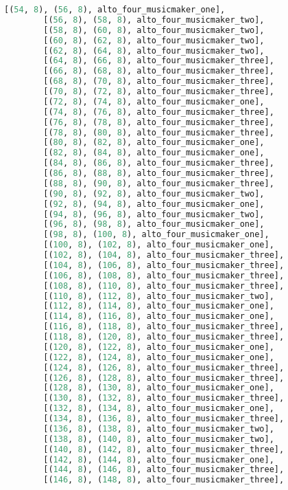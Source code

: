 \begin{lstlisting}[language=Python, caption=Invocation Source Code]
        [(54, 8), (56, 8), alto_four_musicmaker_one],
        [(56, 8), (58, 8), alto_four_musicmaker_two],
        [(58, 8), (60, 8), alto_four_musicmaker_two],
        [(60, 8), (62, 8), alto_four_musicmaker_two],
        [(62, 8), (64, 8), alto_four_musicmaker_two],
        [(64, 8), (66, 8), alto_four_musicmaker_three],
        [(66, 8), (68, 8), alto_four_musicmaker_three],
        [(68, 8), (70, 8), alto_four_musicmaker_three],
        [(70, 8), (72, 8), alto_four_musicmaker_three],
        [(72, 8), (74, 8), alto_four_musicmaker_one],
        [(74, 8), (76, 8), alto_four_musicmaker_three],
        [(76, 8), (78, 8), alto_four_musicmaker_three],
        [(78, 8), (80, 8), alto_four_musicmaker_three],
        [(80, 8), (82, 8), alto_four_musicmaker_one],
        [(82, 8), (84, 8), alto_four_musicmaker_one],
        [(84, 8), (86, 8), alto_four_musicmaker_three],
        [(86, 8), (88, 8), alto_four_musicmaker_three],
        [(88, 8), (90, 8), alto_four_musicmaker_three],
        [(90, 8), (92, 8), alto_four_musicmaker_two],
        [(92, 8), (94, 8), alto_four_musicmaker_one],
        [(94, 8), (96, 8), alto_four_musicmaker_two],
        [(96, 8), (98, 8), alto_four_musicmaker_one],
        [(98, 8), (100, 8), alto_four_musicmaker_one],
        [(100, 8), (102, 8), alto_four_musicmaker_one],
        [(102, 8), (104, 8), alto_four_musicmaker_three],
        [(104, 8), (106, 8), alto_four_musicmaker_three],
        [(106, 8), (108, 8), alto_four_musicmaker_three],
        [(108, 8), (110, 8), alto_four_musicmaker_three],
        [(110, 8), (112, 8), alto_four_musicmaker_two],
        [(112, 8), (114, 8), alto_four_musicmaker_one],
        [(114, 8), (116, 8), alto_four_musicmaker_one],
        [(116, 8), (118, 8), alto_four_musicmaker_three],
        [(118, 8), (120, 8), alto_four_musicmaker_three],
        [(120, 8), (122, 8), alto_four_musicmaker_one],
        [(122, 8), (124, 8), alto_four_musicmaker_one],
        [(124, 8), (126, 8), alto_four_musicmaker_three],
        [(126, 8), (128, 8), alto_four_musicmaker_three],
        [(128, 8), (130, 8), alto_four_musicmaker_one],
        [(130, 8), (132, 8), alto_four_musicmaker_three],
        [(132, 8), (134, 8), alto_four_musicmaker_one],
        [(134, 8), (136, 8), alto_four_musicmaker_three],
        [(136, 8), (138, 8), alto_four_musicmaker_two],
        [(138, 8), (140, 8), alto_four_musicmaker_two],
        [(140, 8), (142, 8), alto_four_musicmaker_three],
        [(142, 8), (144, 8), alto_four_musicmaker_one],
        [(144, 8), (146, 8), alto_four_musicmaker_three],
        [(146, 8), (148, 8), alto_four_musicmaker_three],

\end{lstlisting}
